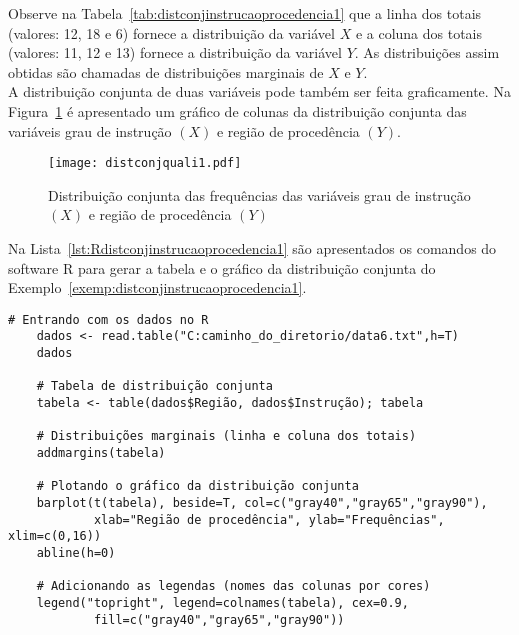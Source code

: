 \documentclass[11pt,fleqn]{book} %
\begin{document}
\begin{example}
Observe na Tabela~\ref{tab:distconjinstrucaoprocedencia1} que a linha dos totais (valores: 12, 18 e 6) fornece a distribuição da variável $X$ e a coluna dos totais (valores: 11, 12 e 13) fornece a distribuição da variável $Y$. As distribuições assim obtidas são chamadas de distribuições marginais de $X$ e $Y$. \\

A distribuição conjunta de duas variáveis pode também ser feita graficamente. Na Figura~\ref{fig:distconjinstrucaoprocedencia1} é apresentado um gráfico de colunas da distribuição conjunta das variáveis grau de instrução $(X)$ e região de procedência $(Y)$. \\

\begin{figure}[h!]
\vspace{0,3cm}
\centering\texttt{[image: distconjquali1.pdf]}
\setlength{\abovecaptionskip}{0.5pt}
\caption{Distribuição conjunta das frequências das variáveis grau de instrução $(X)$ e região de procedência $(Y)$}
\label{fig:distconjinstrucaoprocedencia1} %
\vspace{0.5cm}
\end{figure}

\end{example}



Na Lista~\ref{lst:Rdistconjinstrucaoprocedencia1} são apresentados os comandos do software R para gerar a tabela e o gráfico da distribuição conjunta do Exemplo~\ref{exemp:distconjinstrucaoprocedencia1}.  \\


\begin{scriptsize}
	\estiloR
	\begin{lstlisting}[caption={Comandos do software R}, label=lst:Rdistconjinstrucaoprocedencia1]
	# Entrando com os dados no R
	dados <- read.table("C:caminho_do_diretorio/data6.txt",h=T)
	dados

	# Tabela de distribuição conjunta
	tabela <- table(dados$Região, dados$Instrução); tabela

	# Distribuições marginais (linha e coluna dos totais)
	addmargins(tabela)

	# Plotando o gráfico da distribuição conjunta
	barplot(t(tabela), beside=T, col=c("gray40","gray65","gray90"), 
			xlab="Região de procedência", ylab="Frequências", xlim=c(0,16))
	abline(h=0)

	# Adicionando as legendas (nomes das colunas por cores)
	legend("topright", legend=colnames(tabela), cex=0.9,
			fill=c("gray40","gray65","gray90"))
	

	\end{lstlisting}
\end{scriptsize}
\end{document}
